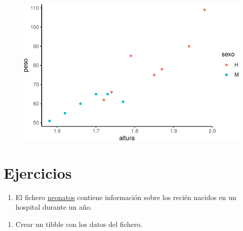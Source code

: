 \documentclass[
  a4paper,
]{scrreport}
\providecommand{\tightlist}{%
  \setlength{\itemsep}{0pt}\setlength{\parskip}{0pt}}\usepackage{longtable,booktabs,array}
\theoremstyle{definition}
\theoremstyle{definition}
\theoremstyle{remark}
\begin{document}
\begin{figure}[H]

{\centering \includegraphics{07-graficos_files/figure-pdf/unnamed-chunk-32-1.pdf}

}

\end{figure}

\hypertarget{ejercicios-4}{%
\section{Ejercicios}\label{ejercicios-4}}

\begin{enumerate}
\def\labelenumi{\arabic{enumi}.}
\tightlist
\item
  El fichero
  \href{https://raw.githubusercontent.com/asalber/manual-r/master/datos/neonatos.csv}{neonatos}
  contiene información sobre los recién nacidos en un hospital durante
  un año.
\end{enumerate}

\begin{enumerate}
\def\labelenumi{\alph{enumi}.}
\tightlist
\item
  Crear un tibble con los datos del fichero.
\end{enumerate}
\end{document}
